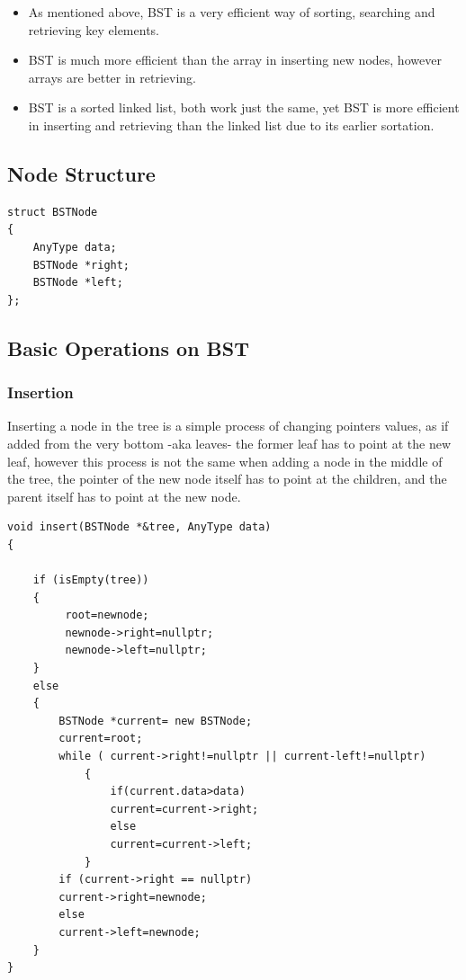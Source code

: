 \documentclass[10pt,a4paper]{article}
\begin{document}
\begin{itemize}
\item As mentioned above, BST is a very efficient way of sorting, searching and retrieving key elements.
\item BST is much more efficient than the array in inserting new nodes, however arrays are better in retrieving.
\item  BST is a sorted linked list, both work just the same, yet BST is more efficient in inserting and retrieving than the linked list due to its earlier sortation.
\end{itemize}

\subsection{Node Structure}

\begin{lstlisting}
struct BSTNode
{
    AnyType data;
    BSTNode *right;
    BSTNode *left;
};
\end{lstlisting}


\subsection{Basic Operations on BST}

\subsubsection{Insertion}


Inserting a node in the tree is a simple process of changing pointers values, as if added from the very bottom -aka leaves- the former leaf has to point at the new leaf, however this process is not the same when adding a node in the middle of the tree, the pointer of the new node itself has to point at the children, and the parent itself has to point at the new node.

\begin{lstlisting}
void insert(BSTNode *&tree, AnyType data)
{   
   
    if (isEmpty(tree))
    {
         root=newnode;
         newnode->right=nullptr;
         newnode->left=nullptr;
    }
    else
    {
        BSTNode *current= new BSTNode;
        current=root;
        while ( current->right!=nullptr || current-left!=nullptr)
            {
                if(current.data>data)
                current=current->right;
                else
                current=current->left;
            }
        if (current->right == nullptr)
        current->right=newnode;
        else
        current->left=newnode;
    }
}

\end{lstlisting}
\end{document}
